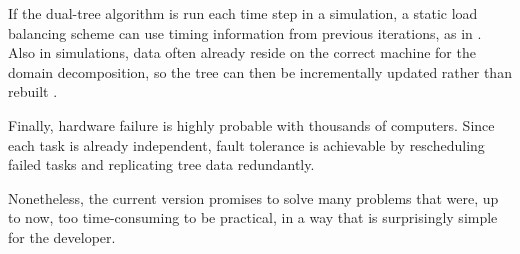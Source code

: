 \documentclass[twoside,leqno,twocolumn]{article}
\begin{document}
If the dual-tree algorithm is run each time step in a simulation, a static load balancing scheme can use timing information from previous iterations, as in \cite{liu94experiences, salmon_thesis, singh_thesis}.
Also in simulations, data often already reside on the correct machine for the domain decomposition, so the tree can then be incrementally updated rather than rebuilt \cite{liu94experiences}.

Finally, hardware failure is highly probable with thousands of computers.
Since each task is already independent, fault tolerance is achievable by rescheduling failed tasks and replicating tree data redundantly.

Nonetheless, the current version promises to solve many problems that were, up to now, too time-consuming to be practical, in a way that is surprisingly simple for the developer.



\end{document}

